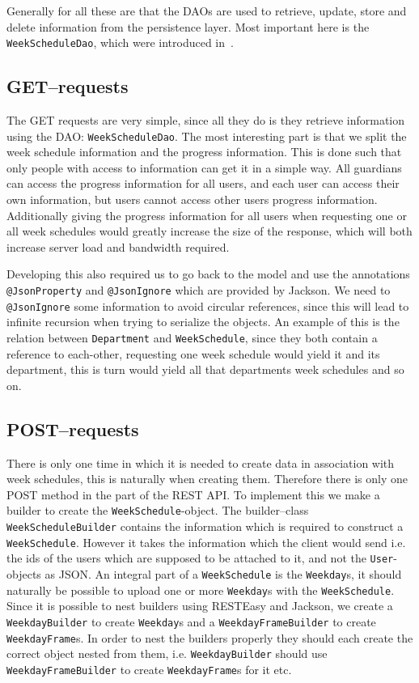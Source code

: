 Generally for all these are that the DAOs are used to retrieve, update, store and delete information from the persistence layer.
Most important here is the \texttt{WeekScheduleDao}, which were introduced in~.

\subsection{GET--requests}
The GET requests are very simple, since all they do is they retrieve information using the DAO: \texttt{WeekScheduleDao}.
The most interesting part is that we split the week schedule information and the progress information.
This is done such that only people with access to information can get it in a simple way.
All guardians can access the progress information for all users, and each user can access their own information, but users cannot access other users progress information.
Additionally giving the progress information for all users when requesting one or all week schedules would greatly increase the size of the response, which will both increase server load and bandwidth required.

Developing this also required us to go back to the model and use the annotations \texttt{@JsonProperty} and \texttt{@JsonIgnore} which are provided by Jackson.
We need to \texttt{@JsonIgnore} some information to avoid circular references, since this will lead to infinite recursion when trying to serialize the objects.
An example of this is the relation between \texttt{Department} and \texttt{WeekSchedule}, since they both contain a reference to each-other, requesting one week schedule would yield it and its department, this is turn would yield all that departments week schedules and so on.

\subsection{POST--requests}
There is only one time in which it is needed to create data in association with week schedules, this is naturally when creating them.
Therefore there is only one POST method in the part of the REST API.
To implement this we make a builder to create the \texttt{WeekSchedule}-object.
The builder--class \texttt{WeekScheduleBuilder} contains the information which is required to construct a \texttt{WeekSchedule}.
However it takes the information which the client would send i.e. the ids of the users which are supposed to be attached to it, and not the \texttt{User}-objects as JSON.
An integral part of a \texttt{WeekSchedule} is the \texttt{Weekday}s, it should naturally be possible to upload one or more \texttt{Weekday}s with the \texttt{WeekSchedule}.
Since it is possible to nest builders using RESTEasy and Jackson, we create a \texttt{WeekdayBuilder} to create \texttt{Weekday}s and a \texttt{WeekdayFrameBuilder} to create \texttt{WeekdayFrame}s.
In order to nest the builders properly they should each create the correct object nested from them, i.e. \texttt{WeekdayBuilder} should use \texttt{WeekdayFrameBuilder} to create \texttt{WeekdayFrame}s for it etc.

